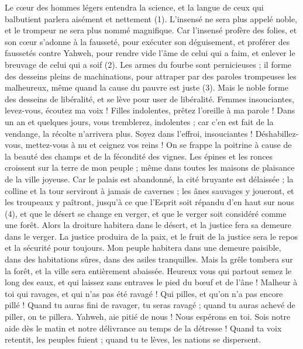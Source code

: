 \begin{multicols}{2}
Le cœur des hommes légers entendra la science, et la langue de ceux qui balbutient parlera aisément et nettement (1).
L’insensé ne sera plus appelé noble, et le trompeur ne sera plus nommé magnifique.
Car l’insensé profère des folies, et son cœur s’adonne à la fausseté, pour exécuter son déguisement, et proférer des faussetés contre Yahweh, pour rendre vide l'âme de celui qui a faim, et enlever le breuvage de celui qui a soif (2).
Les armes du fourbe sont pernicieuses ; il forme des desseins pleins de machinations, pour attraper par des paroles trompeuses les malheureux, même quand la cause du pauvre est juste (3).
Mais le noble forme des desseins de libéralité, et se lève pour user de libéralité.
Femmes insouciantes, levez-vous, écoutez ma voix ! Filles indolentes, prêtez l'oreille à ma parole !
Dans un an et quelques jours, vous tremblerez, indolentes ; car c’en est fait de la vendange, la récolte n’arrivera plus.
Soyez dans l’effroi, insouciantes ! Déshabillez-vous, mettez-vous à nu et ceignez vos reins !
On se frappe la poitrine à cause de la beauté des champs et de la fécondité des vignes.
Les épines et les ronces croissent sur la terre de mon peuple ; même dans toutes les maisons de plaisance de la ville joyeuse.
Car le palais est abandonné, la cité bruyante est délaissée ; la colline et la tour serviront à jamais de cavernes ; les ânes sauvages y joueront, et les troupeaux y paîtront,
jusqu'à ce que l'Esprit soit répandu d'en haut sur nous (4), et que le désert se change en verger, et que le verger soit considéré comme une forêt.
Alors la droiture habitera dans le désert, et la justice fera sa demeure dans le verger.
La justice produira de la paix, et le fruit de la justice sera le repos et la sécurité pour toujours.
Mon peuple habitera dans une demeure paisible, dans des habitations sûres, dans des asiles tranquilles.
Mais la grêle tombera sur la forêt, et la ville sera entièrement abaissée.
Heureux vous qui partout semez le long des eaux, et qui laissez sans entraves le pied du bœuf et de l'âne !
\VerseOne{}Malheur à toi qui ravages, et qui n'as pas été ravagé ! Qui pilles, et qu’on n’a pas encore pillé ! Quand tu auras fini de ravager, tu seras ravagé ; quand tu auras achevé de piller, on te pillera.
Yahweh, aie pitié de nous ! Nous espérons en toi. Sois notre aide dès le matin et notre délivrance au temps de la détresse !
Quand ta voix retentit, les peuples fuient ; quand tu te lèves, les nations se dispersent.

\end{multicols}
